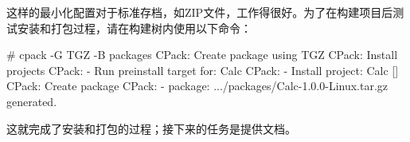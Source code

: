 这样的最小化配置对于标准存档，如ZIP文件，工作得很好。为了在构建项目后测试安装和打包过程，请在构建树内使用以下命令：

\begin{shell}
# cpack -G TGZ -B packages
CPack: Create package using TGZ
CPack: Install projects
CPack: - Run preinstall target for: Calc
CPack: - Install project: Calc []
CPack: Create package
CPack: - package: .../packages/Calc-1.0.0-Linux.tar.gz generated.
\end{shell}

这就完成了安装和打包的过程；接下来的任务是提供文档。















